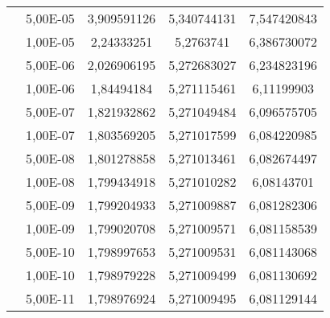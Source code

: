 \documentclass[12pt, a4paper]{report}
\begin{document}
\begin{center}
\begin{tabular}{|c|c|c|c|c|}
 & 5,00E-05 & 3,909591126 & 5,340744131 & 7,547420843 \\
 & 1,00E-05 & 2,24333251 & 5,2763741 & 6,386730072 \\
 & 5,00E-06 & 2,026906195 & 5,272683027 & 6,234823196 \\
 & 1,00E-06 & 1,84494184 & 5,271115461 & 6,11199903 \\
 & 5,00E-07 & 1,821932862 & 5,271049484 & 6,096575705 \\
 & 1,00E-07 & 1,803569205 & 5,271017599 & 6,084220985 \\
 & 5,00E-08 & 1,801278858 & 5,271013461 & 6,082674497 \\
 & 1,00E-08 & 1,799434918 & 5,271010282 & 6,08143701 \\
 & 5,00E-09 & 1,799204933 & 5,271009887 & 6,081282306 \\
 & 1,00E-09 & 1,799020708 & 5,271009571 & 6,081158539 \\
 & 5,00E-10 & 1,798997653 & 5,271009531 & 6,081143068 \\
 & 1,00E-10 & 1,798979228 & 5,271009499 & 6,081130692 \\
 & 5,00E-11 & 1,798976924 & 5,271009495 & 6,081129144 \\
\hline

\end{tabular}
\end{center}
\end{document}
